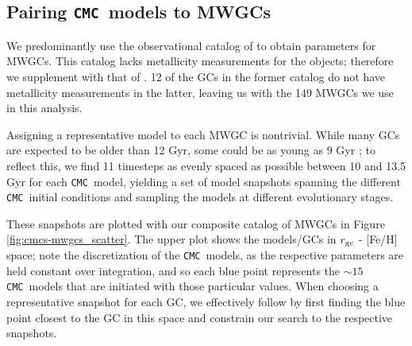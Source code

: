 \documentclass[twocolumn]{aastex631}
\newcommand{\CMC}{\texttt{CMC}}
\begin{document}
\subsection{Pairing \CMC\ models to MWGCs} \label{subsec:pairing}

We predominantly use the observational catalog of \citet{2018MNRAS.478.1520B} to obtain parameters for MWGCs.
This catalog lacks metallicity measurements for the objects; therefore we supplement with that of \citet{2010arXiv1012.3224H}.
12 of the GCs in the former catalog do not have metallicity measurements in the latter, leaving us with the 149 MWGCs we use in this analysis.

Assigning a representative model to each MWGC is nontrivial.
While many GCs are expected to be older than 12 Gyr, some could be as young as 9 Gyr \citep{2013ApJ...775..134V}; to reflect this, we find 11 timesteps as evenly spaced as possible between 10 and 13.5 Gyr for each \CMC\ model, yielding a set of model snapshots spanning the different \CMC\ initial conditions and sampling the models at different evolutionary stages.

These snapshots are plotted with our composite catalog of MWGCs in Figure \ref{fig:cmcs-mwgcs_scatter}.
The upper plot shows the models/GCs in $r_{\rm gc}$ - [Fe/H] space; note the discretization of the \CMC\ models, as the respective parameters are held constant over integration, and so each blue point represents the $\sim 15$ \CMC\ models that are initiated with those particular values.
When choosing a representative snapshot for each GC, we effectively follow \citet{2021ApJ...912..102R} by first finding the blue point closest to the GC in this space and constrain our search to the respective snapshots.
\end{document}
